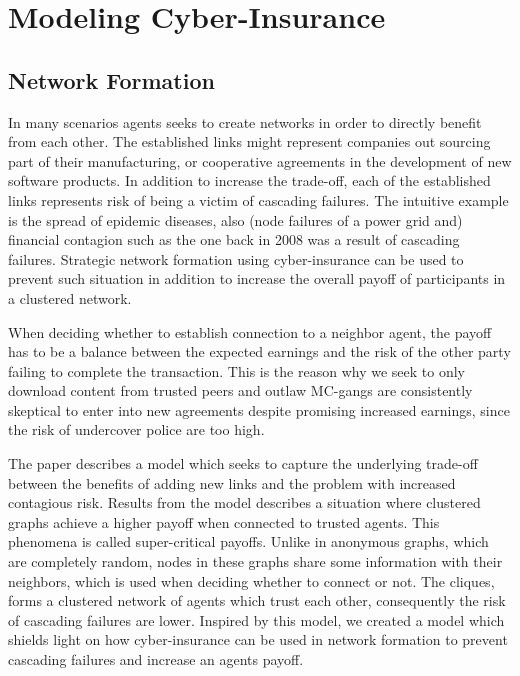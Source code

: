 \chapter{Modeling Cyber-Insurance }
\label{chp:modelingCyberInsurance} 


\section{Network Formation}



In many scenarios agents seeks to create networks in order to directly benefit from each other. The established links might represent companies out sourcing part of their manufacturing, or cooperative agreements in the development of new software products. In addition to increase the trade-off, each of the established links represents risk of being a victim of cascading failures. The intuitive example is the spread of epidemic diseases, also  (node failures of a power grid and) financial contagion such as the one back in 2008 was a result of cascading failures. Strategic network formation using cyber-insurance can be used to prevent such situation in addition to increase the overall payoff of participants in a clustered network.


When deciding whether to establish connection to a neighbor agent, the payoff has to be a balance between the expected earnings and the risk of the other party failing to complete the transaction. This is the reason why we seek to only download content from trusted peers and outlaw MC-gangs are consistently skeptical to enter into new agreements despite promising increased earnings, since the risk of undercover police are too high. 


The paper \cite{contagion} describes a model which seeks to capture the underlying trade-off between the benefits of adding new links and the problem with increased contagious risk. Results from the model describes a situation where clustered graphs achieve a higher payoff when connected to trusted agents. This phenomena is called super-critical payoffs. Unlike in anonymous graphs, which are completely random, nodes in these graphs share some information with their neighbors, which is used when deciding whether to connect or not. The cliques, forms a clustered network of agents which trust each other, consequently the risk of cascading failures are lower.
Inspired by this model, we created a model which shields light on how cyber-insurance can be used in network formation to prevent cascading failures and increase an agents payoff.  

